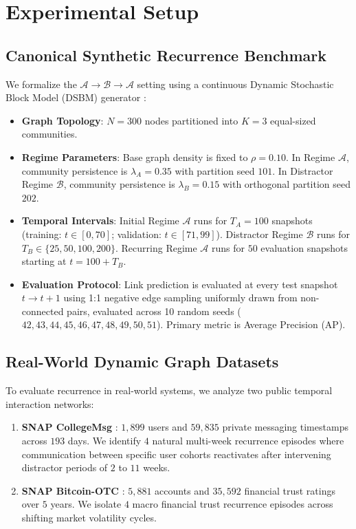 \section{Experimental Setup}
\label{sec:experimental_setup}

\subsection{Canonical Synthetic Recurrence Benchmark}
We formalize the $\mathcal{A} \to \mathcal{B} \to \mathcal{A}$ setting using a continuous Dynamic Stochastic Block Model (DSBM) generator \citep{holland1983stochastic}:
\begin{itemize}
    \item \textbf{Graph Topology}: $N = 300$ nodes partitioned into $K = 3$ equal-sized communities.
    \item \textbf{Regime Parameters}: Base graph density is fixed to $\rho = 0.10$. In Regime $\mathcal{A}$, community persistence is $\lambda_A = 0.35$ with partition seed $101$. In Distractor Regime $\mathcal{B}$, community persistence is $\lambda_B = 0.15$ with orthogonal partition seed $202$.
    \item \textbf{Temporal Intervals}: Initial Regime $\mathcal{A}$ runs for $T_A = 100$ snapshots (training: $t \in [0, 70]$; validation: $t \in [71, 99]$). Distractor Regime $\mathcal{B}$ runs for $T_B \in \{25, 50, 100, 200\}$. Recurring Regime $\mathcal{A}$ runs for $50$ evaluation snapshots starting at $t = 100 + T_B$.
    \item \textbf{Evaluation Protocol}: Link prediction is evaluated at every test snapshot $t \to t+1$ using 1:1 negative edge sampling uniformly drawn from non-connected pairs, evaluated across 10 random seeds ($42, 43, 44, 45, 46, 47, 48, 49, 50, 51$). Primary metric is Average Precision (AP).
\end{itemize}

\subsection{Real-World Dynamic Graph Datasets}
To evaluate recurrence in real-world systems, we analyze two public temporal interaction networks:
\begin{enumerate}
    \item \textbf{SNAP CollegeMsg} \citep{panzarasa2009patterns}: $1,899$ users and $59,835$ private messaging timestamps across $193$ days. We identify $4$ natural multi-week recurrence episodes where communication between specific user cohorts reactivates after intervening distractor periods of $2$ to $11$ weeks.
    \item \textbf{SNAP Bitcoin-OTC} \citep{kumar2016edge}: $5,881$ accounts and $35,592$ financial trust ratings over $5$ years. We isolate $4$ macro financial trust recurrence episodes across shifting market volatility cycles.
\end{enumerate}

